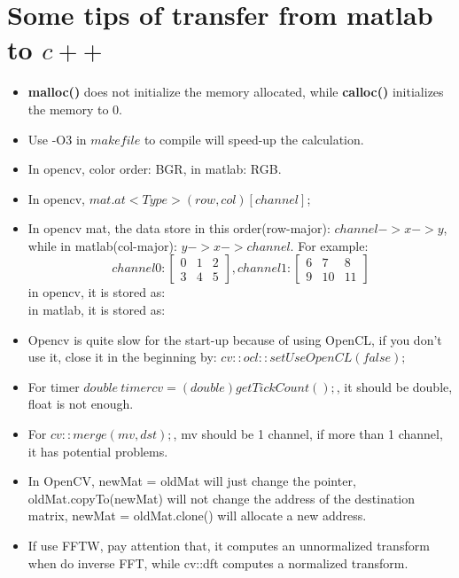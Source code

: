 \documentclass[12pt]{article}
\numberwithin{equation}{section}
\begin{document}
{\section{Some tips of transfer from matlab to $c++$}
\begin{itemize}
	\item \textbf{malloc()} does not initialize the memory allocated, while \textbf{calloc()} initializes the memory to 0.
	\item Use -O3 in $makefile$ to compile will speed-up the calculation. 
	\item In opencv, color order: BGR, in matlab: RGB.
	\item In opencv, $mat.at<Type>(row, col)[channel]$;
	\item In opencv mat, the data store in this order(row-major): $channel -> x-> y$, while in matlab(col-major): $y->x->channel$. For example:
	\begin{equation}
		channel 0:
		\begin{bmatrix}
		0 & 1 & 2 \\
		3 & 4 & 5
		\end{bmatrix}, 
		channel 1:
		\begin{bmatrix}
		6 & 7 & 8 \\
		9 & 10 & 11
		\end{bmatrix}
	\end{equation}
	in opencv, it is stored as:
	\begin{equation}
		[0, 6, 1, 7, 2, 8, 3, 9, 4, 10, 5, 11]
	\end{equation}
	in matlab, it is stored as:
	\begin{equation}
		[0, 3, 1, 4, 2, 5, 6, 9, 7, 10, 8, 11]
	\end{equation}
	\item Opencv is quite slow for the start-up because of using OpenCL, if you don't use it, close it in the beginning by: $cv::ocl::setUseOpenCL(false);$
	\item For timer $double\ timercv = (double)getTickCount();$, it should be double, float is not enough.
	\item For $cv::merge(mv, dst);$, mv should be 1 channel, if more than 1 channel, it has potential problems.
	\item In OpenCV, newMat = oldMat will just change the pointer, oldMat.copyTo(newMat) will not change the address of the destination matrix, newMat = oldMat.clone() will allocate a new address. 
	\item If use FFTW, pay attention that, it computes an unnormalized transform when do inverse FFT, while cv::dft computes a normalized transform.

\end{itemize}}
\end{document}
